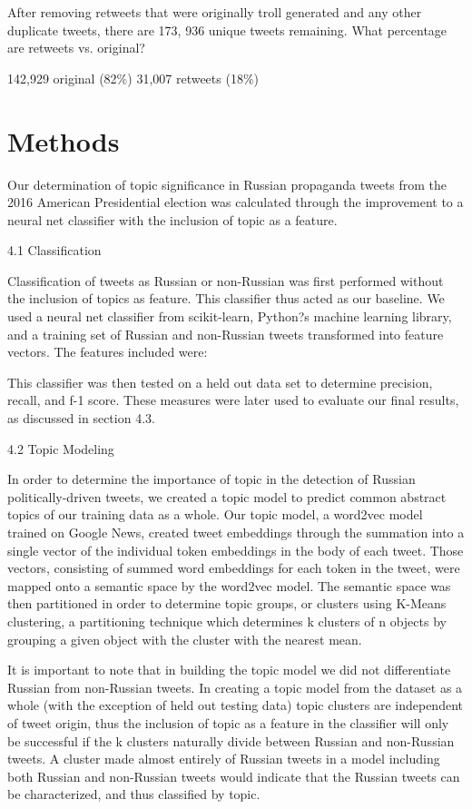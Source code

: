 \documentclass[11pt,a4paper]{article}
\begin{document}
After removing retweets that were originally troll generated and any other duplicate tweets, there are 173, 936 unique tweets remaining. What percentage are retweets vs. original?

142,929 original (82\%)
31,007 retweets  (18\%)

\section{Methods}

Our determination of topic significance in Russian propaganda tweets from the 2016 American Presidential election was calculated through the improvement to a neural net classifier with the inclusion of topic as a feature. 

4.1 Classification

Classification of tweets as Russian or non-Russian was first performed without the inclusion of topics as feature. This classifier thus acted as our baseline. We used a neural net classifier from scikit-learn, Python?s machine learning library, and a training set of Russian and non-Russian tweets transformed into feature vectors. The features included were: 

This classifier was then tested on a held out data set to determine precision, recall, and f-1 score. These measures were later used to evaluate our final results, as discussed in section 4.3. 

4.2 Topic Modeling

In order to determine the importance of topic in the detection of Russian politically-driven tweets, we created a topic model to predict common abstract topics of our training data as a whole. Our topic model, a word2vec model trained on Google News, created tweet embeddings through the summation into a single vector of the individual token embeddings in the body of each tweet. Those vectors, consisting of summed word embeddings for each token in the tweet, were mapped onto a semantic space by the word2vec model. The semantic space was then partitioned in order to determine topic groups, or clusters using K-Means clustering, a partitioning technique which determines k clusters of n objects by grouping a given object with the cluster with the nearest mean.

It is important to note that in building the topic model we did not differentiate Russian from non-Russian tweets. In creating a topic model from the dataset as a whole (with the exception of held out testing data) topic clusters are independent of tweet origin, thus the inclusion of topic as a feature in the classifier will only be successful if the k clusters naturally divide between Russian and non-Russian tweets. A cluster made almost entirely of Russian tweets in a model including both Russian and non-Russian tweets would indicate that the Russian tweets can be characterized, and thus classified by topic. 
\end{document}
